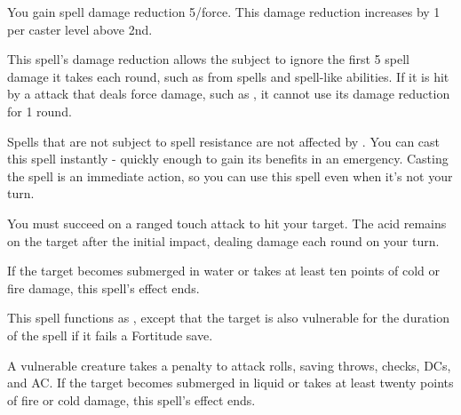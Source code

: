\spellrng{\rngpers}
\begin{spelleffect}
  You gain spell damage reduction 5/force. This damage reduction increases by 1 per caster level above 2nd.
\end{spelleffect}
\begin{spellnotes}
  This spell's damage reduction allows the subject to ignore the first 5 spell damage it takes each round, such as from spells and spell-like abilities. If it is hit by a attack that deals force damage, such as , it cannot use its damage reduction for 1 round.
  
  Spells that are not subject to spell resistance are not affected by . You can cast this spell instantly - quickly enough to gain its benefits in an emergency. Casting the spell is an immediate action, so you can use this spell even when it's not your turn.
\end{spellnotes}

\spellrng{\rngmed}
\begin{spelleffect}
  You must succeed on a ranged touch attack to hit your target. The acid remains on the target after the initial impact, dealing damage each round on your turn.
\end{spelleffect}
\begin{spellnotes}
  If the target becomes submerged in water or takes at least ten points of cold or fire damage, this spell's effect ends.
\end{spellnotes}


\spellrng{\rngfar}
\begin{spelleffect}
  This spell functions as , except that the target is also vulnerable for the duration of the spell if it fails a Fortitude save.
\end{spelleffect}
\begin{spellnotes}
  A vulnerable creature takes a  penalty to attack rolls, saving throws, checks, DCs, and AC. If the target becomes submerged in liquid or takes at least twenty points of fire or cold damage, this spell's effect ends.
\end{spellnotes}

